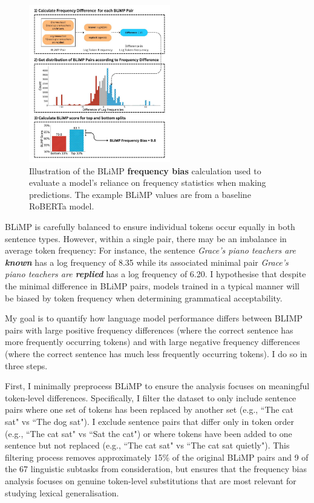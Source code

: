 \begin{figure}
    \vspace{-2em}
    \centering
    \includegraphics[width=0.55\textwidth]{chapters/syntatic-smoothing/figures/blimp_bias_example.pdf}
    \caption{Illustration of the BLiMP \textbf{frequency bias} calculation used to evaluate a model's reliance on frequency statistics when making predictions. The example BLiMP values are from a baseline RoBERTa model.}
    \label{fig:blimp_bias}
    \vspace{-1em}
\end{figure}

BLiMP is carefully balanced to ensure individual tokens occur equally in both sentence types. However, within a single pair, there may be an imbalance in average token frequency: For instance, the sentence
\textit{Grace's piano teachers are \textbf{known}} has a log frequency of 8.35 while its associated minimal pair \textit{Grace's piano teachers are \textbf{replied}} has a log frequency of 6.20.  I hypothesise that despite the minimal difference in BLiMP pairs, models trained in a typical manner will be biased by token frequency when determining grammatical acceptability.

My goal is to quantify how language model performance differs between BLIMP pairs with large positive frequency differences (where the correct sentence has more frequently occurring tokens) and with large negative frequency differences (where the correct sentence has much less frequently occurring tokens). I do so in three steps.

First, I minimally preprocess BLiMP to ensure the analysis focuses on meaningful token-level differences. Specifically, I filter the dataset to only include sentence pairs where one set of tokens has been replaced by another set (e.g., ``The cat sat" vs ``The dog sat"). I exclude sentence pairs that differ only in token order (e.g., ``The cat sat" vs ``Sat the cat") or where tokens have been added to one sentence but not replaced (e.g., ``The cat sat" vs ``The cat sat quietly"). This filtering process removes approximately 15\% of the original BLiMP pairs and 9 of the 67 linguistic subtasks from consideration, but ensures that the frequency bias analysis focuses on genuine token-level substitutions that are most relevant for studying lexical generalisation.

